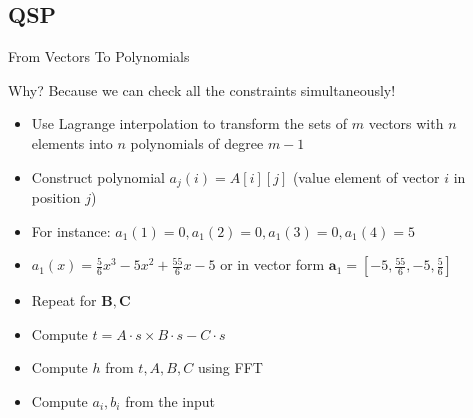 \documentclass[handout]{beamer}
\begin{document}
\subsection{QSP}
\begin{frame}{From Vectors To Polynomials}
    \begin{block}{Why?}
        Because we can check all the constraints simultaneously!
    \end{block}
    \begin{itemize}
        \item Use Lagrange interpolation to transform the sets of $m$ vectors with $n$ elements into $n$ polynomials of degree $m-1$
        \item Construct polynomial $a_j(i) =A[i][j]$ (value element of vector $i$ in position $j$)
        \item For instance: $a_1(1) = 0, a_1(2) = 0, a_1(3)=0, a_1(4) = 5$
        \item $a_1(x) = \frac{5}{6}x^3-5x^2+\frac{55}{6}x-5$ or in vector form $\bm{a}_1 = [-5,\frac{55}{6},-5,\frac{5}{6}]$
        \item Repeat for $\bm{B}, \bm{C}$
        \item Compute $t = A \cdot s \times B \cdot s - C \cdot s$
        \item Compute $h$ from $t,A,B,C$ using FFT 
        \item Compute $a_i, b_i$ from the input
    \end{itemize}
\end{frame}
 
\end{document}
